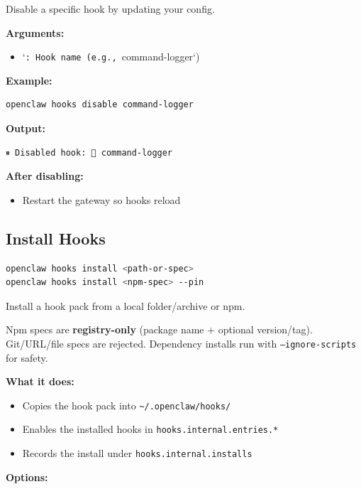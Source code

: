 Disable a specific hook by updating your config.

\textbf{Arguments:}

\begin{itemize}
  \item `\texttt{: Hook name (e.g., }command-logger`)
\end{itemize}


\textbf{Example:}

\begin{lstlisting}[language=bash]
openclaw hooks disable command-logger
\end{lstlisting}


\textbf{Output:}

\begin{lstlisting}
⏸ Disabled hook: 📝 command-logger
\end{lstlisting}


\textbf{After disabling:}

\begin{itemize}
  \item Restart the gateway so hooks reload
\end{itemize}


\subsection{Install Hooks}


\begin{lstlisting}[language=bash]
openclaw hooks install <path-or-spec>
openclaw hooks install <npm-spec> --pin
\end{lstlisting}


Install a hook pack from a local folder/archive or npm.

Npm specs are \textbf{registry-only} (package name + optional version/tag). Git/URL/file
specs are rejected. Dependency installs run with \texttt{--ignore-scripts} for safety.

\textbf{What it does:}

\begin{itemize}
  \item Copies the hook pack into \texttt{\textasciitilde{}/.openclaw/hooks/}
  \item Enables the installed hooks in \texttt{hooks.internal.entries.*}
  \item Records the install under \texttt{hooks.internal.installs}
\end{itemize}


\textbf{Options:}

